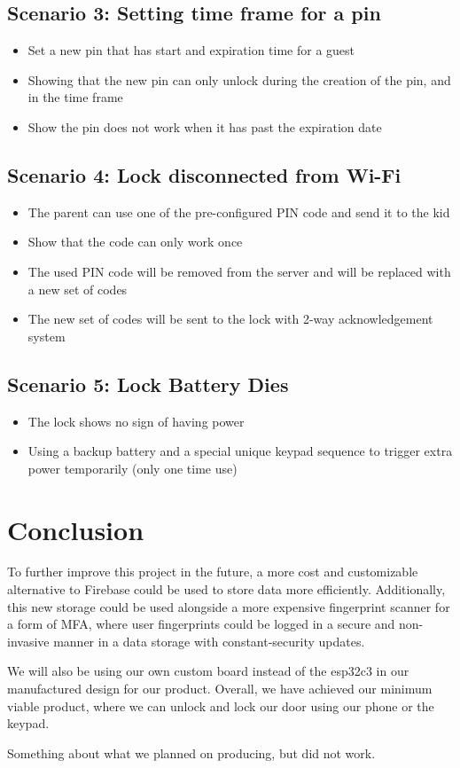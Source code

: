 \documentclass[12pt]{article}
\begin{document}
\subsection{Scenario 3: Setting time frame for a pin}
\begin{itemize}
    \item Set a new pin that has start and expiration time for a guest
    \item Showing that the new pin can only unlock during the creation of the pin, and in the time frame
    \item Show the pin does not work when it has past the expiration date
\end{itemize}

\subsection{Scenario 4: Lock disconnected from Wi-Fi}
\begin{itemize}
    \item The parent can use one of the pre-configured PIN code and send it to the kid
    \item Show that the code can only work once
    \item The used PIN code will be removed from the server and will be replaced with a new set of codes
    \item The new set of codes will be sent to the lock with 2-way acknowledgement system
\end{itemize}

\subsection{Scenario 5: Lock Battery Dies}
\begin{itemize}
    \item The lock shows no sign of having power
    \item Using a backup battery and a special unique keypad sequence to trigger extra power temporarily (only one time use)
\end{itemize}

\section{Conclusion}
To further improve this project in the future, a more cost and customizable alternative to Firebase could be used to store data more efficiently. Additionally, this new storage could be used alongside a more expensive fingerprint scanner for a form of MFA, where user fingerprints could be logged in a secure and non-invasive manner in a data storage with constant-security updates.

We will also be using our own custom board instead of the esp32c3 in our manufactured design for our product. Overall, we have achieved our minimum viable product, where we can unlock and lock our door using our phone or the keypad.

Something about what we planned on producing, but did not work.
\end{document}
